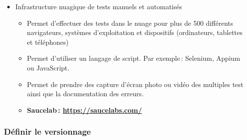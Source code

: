 \begin{frame}[allowframebreaks]
\begin {itemize}
				\begin {itemize}
				\item Activité qui consiste à attribuer à chaque bogue relevé dans un programme une adresse permettant d'accéder à un fichier décrivant les caractéristiques de ce bogue, de manière à évaluer leur importance et à contrôler les dommages qu'ils pourraient causer.  \\Le suivi de bogues comprend\,:
					\begin {itemize}
					\item l'enregistrement des bogues, 
					\item leur examen, 
					\item l'enregistrement des correctifs requis,
					\item la décision de considérer ou non la pertinence d'une correction, selon l'importance du bogue et le budget disponible \citep{OQLF2003a}.  
					\end{itemize}
					\item \textbf{Buggenie\,: \url{http://www.thebuggenie.com/}}
				\end{itemize}
			\framebreak
			\item Infrastructure nuagique de tests manuels et automatisés
				\begin {itemize}
					\item Permet d'effectuer des tests dans le nuage pour plus de 500 différents navigateurs, systèmes d'exploitation et dispositifs (ordinateurs, tablettes et téléphones)
					\item Permet d'utiliser un langage de script. Par exemple\,: Selenium, Appium ou JavaScript.
					\item Permet de prendre des capture d'écran photo ou vidéo des multiples test ainsi que la documentation des erreurs.
					\item \textbf{Saucelab\,: \url{https://saucelabs.com/} }
					\end{itemize}

			
			\end{itemize}
		\end{frame}    
						\subsubsection{Définir le versionnage}

